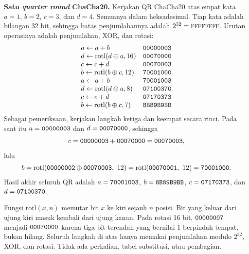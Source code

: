 \begin{example}
\textbf{Satu \textit{quarter round} ChaCha20.} Kerjakan QR ChaCha20 atas empat
kata $a=1$, $b=2$, $c=3$, dan $d=4$. Semuanya dalam heksadesimal. Tiap kata
adalah bilangan 32 bit, sehingga batas penjumlahannya adalah
$2^{32}=\texttt{FFFFFFFF}$. Urutan operasinya adalah penjumlahan, XOR, dan
rotasi:
\[
\begin{array}{lr}
a \leftarrow a+b                          & \texttt{00000003}\\
d \leftarrow \mathrm{rotl}(d \oplus a,16) & \texttt{00070000}\\
c \leftarrow c+d                          & \texttt{00070003}\\
b \leftarrow \mathrm{rotl}(b \oplus c,12) & \texttt{70001000}\\
a \leftarrow a+b                          & \texttt{70001003}\\
d \leftarrow \mathrm{rotl}(d \oplus a,8)  & \texttt{07100370}\\
c \leftarrow c+d                          & \texttt{07170373}\\
b \leftarrow \mathrm{rotl}(b \oplus c,7)  & \texttt{8B89B9BB}
\end{array}
\]
Sebagai pemeriksaan, kerjakan langkah ketiga dan keempat secara rinci. Pada saat
itu $a=\texttt{00000003}$ dan $d=\texttt{00070000}$, sehingga
\[
c = \texttt{00000003} + \texttt{00070000} = \texttt{00070003},
\]
lalu
\[
b = \mathrm{rotl}(\texttt{00000002} \oplus \texttt{00070003},\ 12)
  = \mathrm{rotl}(\texttt{00070001},\ 12)
  = \texttt{70001000}.
\]
Hasil akhir seluruh QR adalah $a=\texttt{70001003}$, $b=\texttt{8B89B9BB}$,
$c=\texttt{07170373}$, dan $d=\texttt{07100370}$.

Fungsi $\mathrm{rotl}(x,n)$ memutar bit $x$ ke kiri sejauh $n$ posisi. Bit yang
keluar dari ujung kiri masuk kembali dari ujung kanan. Pada rotasi 16 bit,
$\texttt{00000007}$ menjadi $\texttt{00070000}$ karena tiga bit terendah yang
bernilai $1$ berpindah tempat, bukan hilang. Seluruh langkah di atas hanya
memakai penjumlahan modulo $2^{32}$, XOR, dan rotasi. Tidak ada perkalian,
tabel substitusi, atau pembagian.
\end{example}
